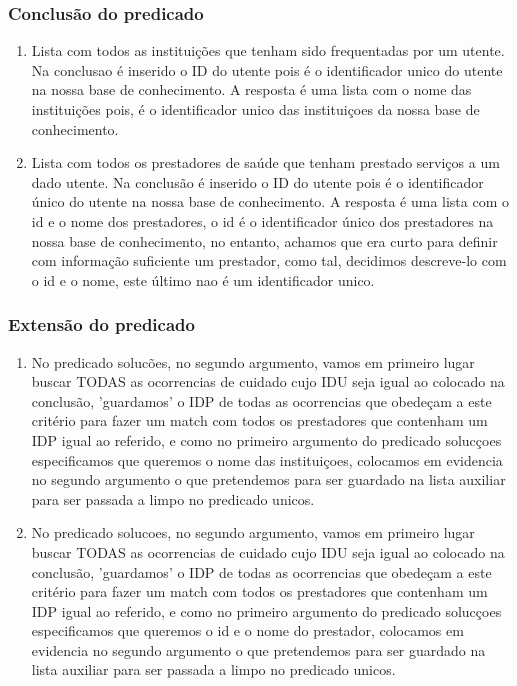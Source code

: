 \documentclass[a4paper]{report} %
\begin{document}
\subsubsection{Conclusão do predicado} 
\begin{enumerate}
\item Lista com todos as instituições que tenham sido frequentadas por um utente. Na conclusao é inserido o ID do utente pois é o identificador unico do utente na nossa base de conhecimento. A resposta é uma lista com o nome das instituições pois, é o identificador unico das instituiçoes da nossa base de conhecimento.
\item Lista com todos os prestadores de saúde que tenham prestado serviços a um dado utente. Na conclusão é inserido o ID do utente pois é o identificador único do utente na nossa base de conhecimento. A resposta é uma lista com o id e o nome dos prestadores, o id é o identificador único dos prestadores na nossa base de conhecimento, no entanto, achamos que era curto para definir com informação suficiente um prestador, como tal, decidimos descreve-lo com o id e o nome, este último nao é um identificador unico.
\end{enumerate}

\subsubsection{Extensão do predicado}
\begin{enumerate}
\item No predicado solucões, no segundo argumento, vamos em primeiro lugar buscar TODAS as ocorrencias de cuidado cujo IDU seja igual ao colocado na conclusão, 'guardamos' o IDP de todas as ocorrencias que obedeçam a este critério para fazer um match com todos os prestadores que contenham um IDP igual ao referido, e como no primeiro argumento do predicado solucçoes especificamos que queremos o nome das instituiçoes, colocamos em evidencia no segundo argumento o que pretendemos para ser guardado na lista auxiliar para ser passada a limpo no predicado unicos.  
\item No predicado solucoes, no segundo argumento, vamos em primeiro lugar buscar TODAS as ocorrencias de cuidado cujo IDU seja igual ao colocado na conclusão, 'guardamos' o IDP de todas as ocorrencias que obedeçam a este critério para fazer um match com todos os prestadores que contenham um IDP igual ao referido, e como no primeiro argumento do predicado solucçoes especificamos que queremos o id e o nome do prestador, colocamos em evidencia no segundo argumento o que pretendemos para ser guardado na lista auxiliar para ser passada a limpo no predicado unicos.  
\end{enumerate}
\end{document}
